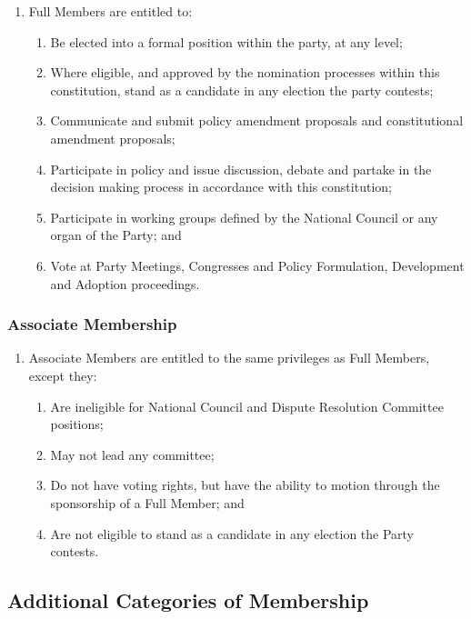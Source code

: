 \documentclass[a4paper,titlepage,8.5pt]{article}
\begin{document}
\begin{enumerate}
\item Full Members are entitled to:
\begin{enumerate}
\item Be elected into a formal position within the party, at any level;
\item Where eligible, and approved by the nomination processes within this constitution, stand as a candidate in any election the party contests;
\item Communicate and submit policy amendment proposals and constitutional amendment proposals;
\item Participate in policy and issue discussion, debate and partake in the decision making process in accordance with this constitution;
\item Participate in working groups defined by the National Council or any organ of the Party; and
\item Vote at Party Meetings, Congresses and Policy Formulation, Development and Adoption proceedings.
\end{enumerate}
\end{enumerate}

\subsubsection{Associate Membership}

\begin{enumerate}
\item Associate Members are entitled to the same privileges as Full Members, except they:
\begin{enumerate}
\item Are ineligible for National Council and Dispute Resolution Committee positions;
\item May not lead any committee;
\item Do not have voting rights, but have the ability to motion through the sponsorship of a Full Member; and
\item Are not eligible to stand as a candidate in any election the Party contests.
\end{enumerate}
\end{enumerate}

\subsection{Additional Categories of Membership} 
\end{document}
